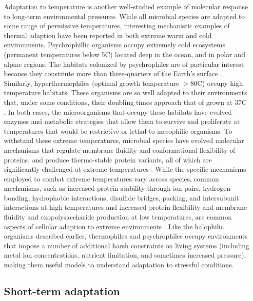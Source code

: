 Adaptation to temperature is another well-studied example of molecular response to long-term environmental pressures. While all microbial species are adapted to some range of permissive temperatures, interesting mechanistic examples of thermal adaption have been reported in both extreme warm and cold environments. Psychrophillic organisms occupy extremely cold ecosystems (permanent temperatures below 5C) located deep in the ocean, and in polar and alpine regions. The habitats colonized by psychrophiles are of particular interest because they constitute more than three-quarters of the Earth's surface \cite{feller_psychrophilic_2003}. Similarly, hyperthermophiles (optimal growth temperature $>$80C) occupy high temperature habitats. These organisms are so well adapted to their environments that, under some conditions, their doubling times approach that of \eco grown at 37C \cite{feller_psychrophilic_2003}. In both cases, the microorganisms that occupy these habitats have evolved enzymes and metabolic strategies that allow them to survive and proliferate at temperatures that would be restrictive or lethal to mesophilic organisms. To withstand these extreme temperatures, microbial species have evolved molecular mechanisms that regulate membrane fluidity and conformational flexibility of proteins, and produce thermo-stable protein variants, all of which are significantly challenged at extreme temperatures \cite{feller_life_2007,vieille_bivalent_2001}. While the specific mechanisms employed to combat extreme temperatures vary across species, common mechanisms, such as increased protein stability through ion pairs, hydrogen bonding, hydrophobic interactions, disulfide bridges, packing, and intersubunit interactions at high temperatures and increased protein flexibility and membrane fluidity and exopolysaccharide production at low temperatures, are common aspects of cellular adaption to extreme environments \cite{jaenicke_protein_1991}. Like the halophilic organisms described earlier, thermophiles and psychrophiles occupy environments that impose a number of additional harsh constraints on living systems (including metal ion concentrations, nutrient limitation, and sometimes increased pressure), making them useful models to understand adaptation to stressful conditions. 

\subsection{Short-term adaptation} 

